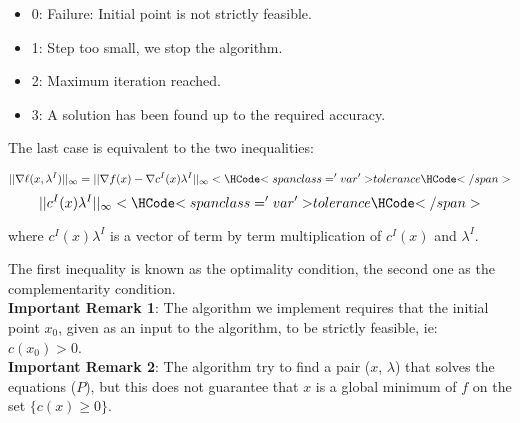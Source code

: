 \begin{itemize}
\begin{itemize}
 \item 0: Failure: Initial point is not strictly feasible.
 \item 1: Step too small, we stop the algorithm.
 \item 2: Maximum iteration reached.
 \item 3: A solution has been found up to the required accuracy.
\end{itemize}

The last case is equivalent to the two inequalities:

$$ || \nabla \ell(x,\lambda^I)||_{\infty} = ||\nabla f(x) - \nabla c^I(x) \lambda^I ||_{\infty} < \var{tolerance} $$
$$ || c^I(x) \lambda^I ||_{\infty} < \var{tolerance} $$

where $c^I(x) \lambda^I$ is a vector of term by term multiplication of $c^I(x)$ and $\lambda^I$.

The first inequality is known as the optimality condition, the second one as the complementarity condition.\\

\textbf{Important Remark 1}: The algorithm we implement requires that the initial point $x_0$, given as an input to the algorithm, to be strictly feasible, ie: $c(x_0)>0$.\\
\textbf{Important Remark 2}: The algorithm try to find a pair ($x$, $\lambda$) that solves the equations ($P$), but this does not guarantee that $x$ is a global minimum of $f$ on the set $\{c(x)\geq0\}$.

\end{itemize}

